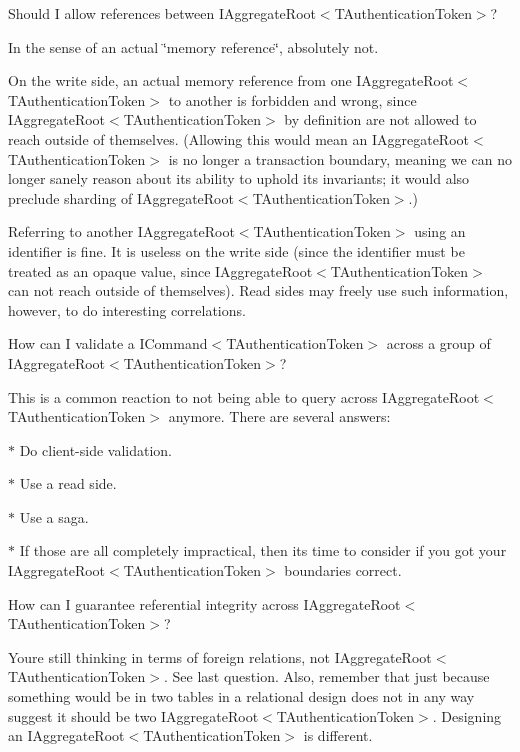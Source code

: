 Should I allow references between I\+Aggregate\+Root$<$\+T\+Authentication\+Token$>$? 

In the sense of an actual \char`\"{}memory reference\char`\"{}, absolutely not. 

On the write side, an actual memory reference from one I\+Aggregate\+Root$<$\+T\+Authentication\+Token$>$ to another is forbidden and wrong, since I\+Aggregate\+Root$<$\+T\+Authentication\+Token$>$ by definition are not allowed to reach outside of themselves. (Allowing this would mean an I\+Aggregate\+Root$<$\+T\+Authentication\+Token$>$ is no longer a transaction boundary, meaning we can no longer sanely reason about its ability to uphold its invariants; it would also preclude sharding of I\+Aggregate\+Root$<$\+T\+Authentication\+Token$>$.) 

Referring to another I\+Aggregate\+Root$<$\+T\+Authentication\+Token$>$ using an identifier is fine. It is useless on the write side (since the identifier must be treated as an opaque value, since I\+Aggregate\+Root$<$\+T\+Authentication\+Token$>$ can not reach outside of themselves). Read sides may freely use such information, however, to do interesting correlations. 

How can I validate a I\+Command$<$\+T\+Authentication\+Token$>$ across a group of I\+Aggregate\+Root$<$\+T\+Authentication\+Token$>$? 

This is a common reaction to not being able to query across I\+Aggregate\+Root$<$\+T\+Authentication\+Token$>$ anymore. There are several answers\+: 

$\ast$ Do client-\/side validation. 

$\ast$ Use a read side. 

$\ast$ Use a saga. 

$\ast$ If those are all completely impractical, then it\textquotesingle{}s time to consider if you got your I\+Aggregate\+Root$<$\+T\+Authentication\+Token$>$ boundaries correct. 

How can I guarantee referential integrity across I\+Aggregate\+Root$<$\+T\+Authentication\+Token$>$? 

You\textquotesingle{}re still thinking in terms of foreign relations, not I\+Aggregate\+Root$<$\+T\+Authentication\+Token$>$. See last question. Also, remember that just because something would be in two tables in a relational design does not in any way suggest it should be two I\+Aggregate\+Root$<$\+T\+Authentication\+Token$>$. Designing an I\+Aggregate\+Root$<$\+T\+Authentication\+Token$>$ is different. 


